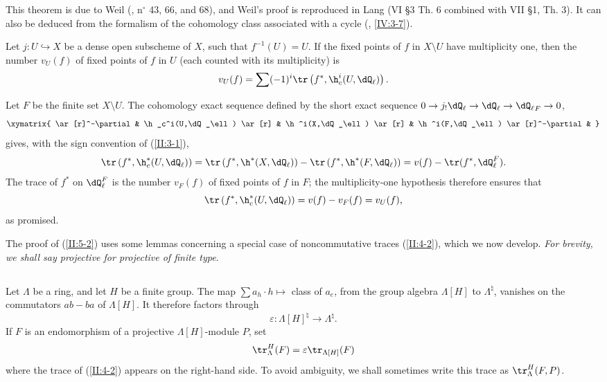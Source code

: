 This theorem is due to Weil (, n$^\circ$ 43, 66, and 68), and Weil's
proof is reproduced in Lang  (VI \S3 Th. 6 combined with VII \S1,
Th. 3). It can also be deduced from the formalism of the cohomology class
associated with a cycle (, \ref{IV:3-7}).






\begin{corollary_}\label{II:5-4}
Let $j:U\hookrightarrow X$ be a dense open subscheme of $X$, such that
$f^{-1}(U)=U$. If the fixed points of $f$ in $X\setminus U$ have multiplicity
one, then the number $v_U(f)$ of fixed points of $f$ in $U$ (each counted
with its multiplicity) is
\[
  v_U(f) = \sum (-1)^i \tr\left(f^*,\h_c^i(U,\dQ_\ell)\right) \text{.}
\]
\end{corollary_}

Let $F$ be the finite set $X\setminus U$. The cohomology exact sequence
defined by the short exact sequence
$0\to j_! \dQ_\ell\to\dQ_\ell\to{\dQ_\ell}_F\to 0$,
\[\xymatrix{
  \ar[r]^-\partial
    & \h_c^i(U,\dQ_\ell) \ar[r]
    & \h^i(X,\dQ_\ell) \ar[r]
    & \h^i(F,\dQ_\ell) \ar[r]^-\partial
    &
}\]
gives, with the sign convention of (\ref{II:3-1}),
\[
  \tr\left(f^*,\h_c^*(U,\dQ_\ell)\right)
    = \tr\left(f^*,\h^*(X,\dQ_\ell)\right) - \tr\left(f^*,\h^*(F,\dQ_\ell)\right)
    = v(f) - \tr(f^*,\dQ_\ell^F) \text{.}
\]
The trace of $f^*$ on $\dQ_\ell^F$ is the number $v_F(f)$ of fixed points of
$f$ in $F$; the multiplicity-one hypothesis therefore ensures that
\[
  \tr\left(f^*,\h_c^*(U,\dQ_\ell)\right)
    = v(f) - v_F(f) = v_U(f) \text{,}
\]
as promised.

The proof of (\ref{II:5-2}) uses some lemmas concerning a special case of
noncommutative traces (\ref{II:4-2}), which we now develop. \emph{For
brevity, we shall say projective for projective of finite type}.






\subsection{}\label{II:5-5}

Let $\Lambda$ be a ring, and let $H$ be a finite group. The map
$\sum a_h \cdot h\mapsto $ class of $a_e$, from the group algebra
$\Lambda[H]$ to $\Lambda^\natural$, vanishes on the commutators $ab-ba$ of
$\Lambda[H]$. It therefore factors through
\[
  \varepsilon : \Lambda[H]^\natural \to \Lambda^\natural \text{.}
\]
If $F$ is an endomorphism of a projective $\Lambda[H]$-module $P$, set
\[
  \tr_\Lambda^H(F) = \varepsilon \tr_{\Lambda[H]} (F)
\]
where the trace of (\ref{II:4-2}) appears on the right-hand side. To avoid
ambiguity, we shall sometimes write this trace as $\tr_\Lambda^H(F,P)$.






